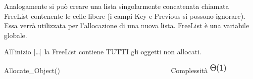 \documentclass{article}
\begin{document}
{}

{}

{Analogamente si può creare una lista singolarmente concatenata chiamata
FreeList contenente le celle libere (i campi Key e Previous si possono
ignorare). Essa verrà utilizzata per l'allocazione di una nuova lista.
FreeList è una variabile globale.}

{}

{All'inizio {[}\ldots{}{]} la FreeList contiene TUTTI gli oggetti non
allocati.}

{}

{Allocate\_Object()~~~~~~~~~~~~~~~~~~~~~~~~~~~~~~~~}{Complessità
}\includegraphics{images/image69.png}

{~~~~~~~~}

\protect\hypertarget{t.6867fb3c644d0c0b07e14f5253c873dd313c05de}{}{}\protect\hypertarget{t.3}{}{}
\end{document}
